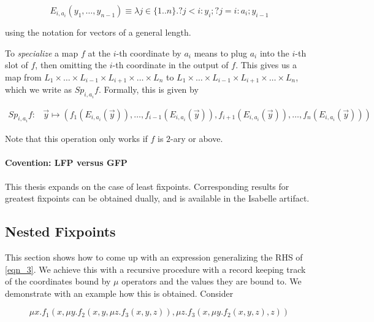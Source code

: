 \begin{equation}
  E_{i,a_i}(y_1,\dots,y_{n-1}) \equiv \lambda j\in\{1..n\}. ?j<i: y_i; ?j=i:a_i; y_{i-1}  
\end{equation}

using the notation for vectors of a general length. 

To \textit{specialize} a map $f$ at the $i$-th coordinate by $a_i$ means to plug $a_i$ into the $i$-th slot of $f$, then omitting the $i$-th coordinate in the output of $f$. This gives us a map from $L_1\times\dots \times L_{i-1} \times L_{i+1} \times\dots \times L_n$ to $L_1\times\dots \times L_{i-1} \times L_{i+1} \times\dots \times L_n$, which we write as $Sp_{i,a_i}f$. Formally, this is given by

\begin{align}
    \label{eqn:fn_specialize}
 Sp_{i,a_i}f: & \vec{y} \mapsto (f_1(E_{i,a_i}(\vec{y})),\dots,{f_{i-1}(E_{i,a_i}(\vec{y}))},{f_{i+1}(E_{i,a_i}(\vec{y}))}, \dots, f_n(E_{i,a_i}(\vec{y})))
\end{align}

Note that this operation only works if $f$ is $2$-ary or above.

\paragraph*{Covention: LFP versus GFP}

This thesis expands on the case of least fixpoints. Corresponding results for greatest fixpoints can be obtained dually, and is available in the Isabelle artifact.

\subsection{Nested Fixpoints}
\label{subsec:nested_fp}
This section shows how to come up with an expression generalizing the RHS of \autoref{eqn_3}. We achieve this with a recursive procedure with a record keeping track of the coordinates bound by $\mu$ operators and the values they are bound to. We demonstrate with an example how this is obtained. Consider

\begin{equation}
    \label{eqn:nested31}
    \mu x. f_1(x,\mu y.f_2(x,y,\mu z. f_3(x,y,z)), \mu z. f_3(x,\mu y.f_2(x,y,z),z))
\end{equation}

